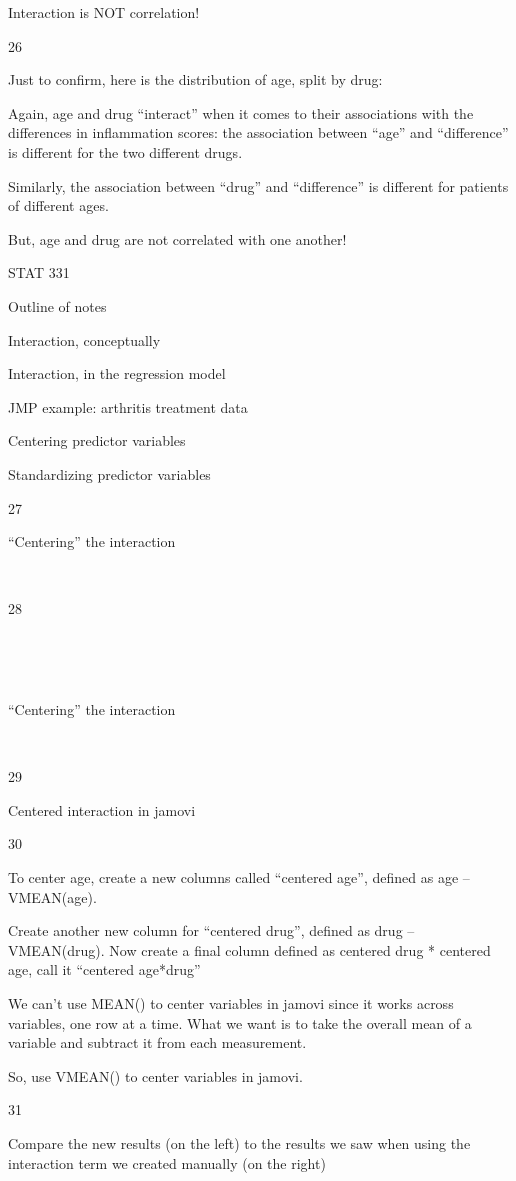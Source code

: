\documentclass[
  letterpaper,
  DIV=11,
  numbers=noendperiod]{scrreprt}
\begin{document}
Interaction is NOT correlation!

26

Just to confirm, here is the distribution of age, split by drug:

Again, age and drug ``interact'' when it comes to their associations
with the differences in inflammation scores: the association between
``age'' and ``difference'' is different for the two different drugs.

Similarly, the association between ``drug'' and ``difference'' is
different for patients of different ages.

But, age and drug are not correlated with one another!

STAT 331

Outline of notes

Interaction, conceptually

Interaction, in the regression model

JMP example: arthritis treatment data

Centering predictor variables

Standardizing predictor variables

27

``Centering'' the interaction

~

28

~

~

``Centering'' the interaction

~

29

Centered interaction in jamovi

30

To center age, create a new columns called ``centered age'', defined as
age -- VMEAN(age).

Create another new column for ``centered drug'', defined as drug --
VMEAN(drug). Now create a final column defined as centered drug *
centered age, call it ``centered age*drug''

We can't use MEAN() to center variables in jamovi since it works across
variables, one row at a time. What we want is to take the overall mean
of a variable and subtract it from each measurement.

So, use VMEAN() to center variables in jamovi.

31

Compare the new results (on the left) to the results we saw when using
the interaction term we created manually (on the right)
\end{document}

